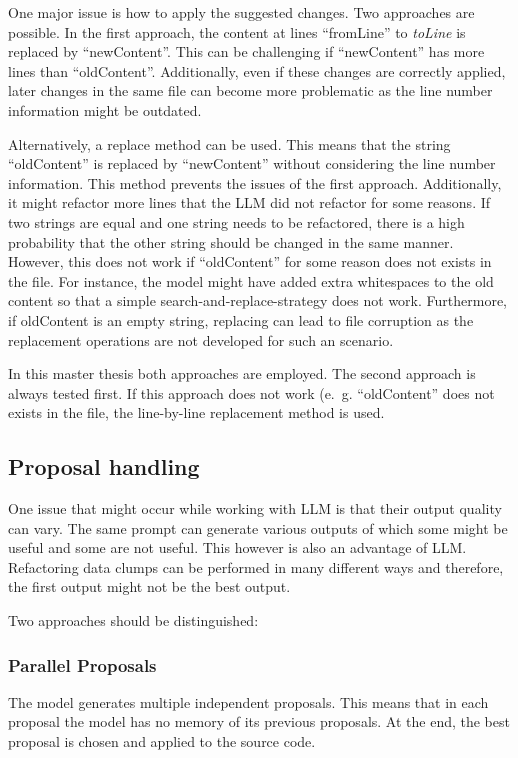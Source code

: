 One major issue is how to apply the suggested changes. Two approaches are possible.
In the first approach, the content at lines \enquote{fromLine} to \textit{toLine} is replaced by \enquote{newContent}. This can be challenging if \enquote{newContent} has more lines than \enquote{oldContent}. Additionally, even if these  changes are correctly applied, later changes in the same file can become more problematic as the line number information might be outdated. 

Alternatively, a replace method can be used. This means that the string \enquote{oldContent} is replaced by \enquote{newContent} without considering the line number information. This method prevents the issues of the first approach. Additionally, it might refactor more lines that the \ac{LLM} did not refactor for some reasons. If two strings are equal and one string needs to be refactored, there is a high probability that the other string should be changed in the same manner. However, this does not work if \enquote{oldContent} for some reason does not exists in the file. For instance, the model might have added extra whitespaces to the old content so that a simple search-and-replace-strategy does not work. Furthermore, if oldContent is an empty string, replacing can lead to file corruption as the replacement operations are not developed for such an scenario. 

In this master thesis both approaches are employed. The second approach is always tested first. If this approach does not work (e.~g. \enquote{oldContent} does not exists in the file, the line-by-line replacement method is used.  




\subsection{Proposal handling}

One issue that might occur while working with \ac{LLM} is that their output quality can vary. The same prompt can generate various outputs of which some might be useful and some are not useful. This however is also an advantage of \acs{LLM}. Refactoring data clumps can be performed in many different ways and therefore, the first output might not be the best output. 

Two approaches should be distinguished:
\subsubsection{Parallel Proposals}
The model generates multiple independent proposals. This means that in each proposal the model has no memory of its previous proposals. At the end, the best proposal is chosen and applied to the source code.

